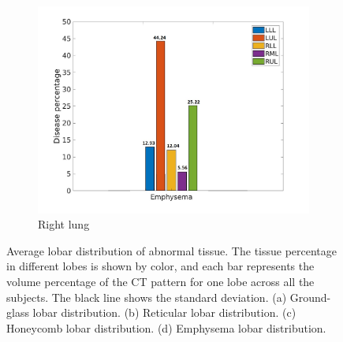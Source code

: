\begin{figure}[H]
\begin{subfigure}{.46\linewidth}
  \includegraphics[width=\linewidth,trim={{.0\wd0} {.0\wd0} {.0\wd0} {.0\wd0}},clip]{QuantitativeAnalysis/Image/EmphysemaLobarRegionDiseaseDistribution.jpg}
  \caption{Right lung}
  \label{fig:LobarRegionDiseaseDistribution-d}
\end{subfigure}
\caption{Average lobar distribution of abnormal tissue. The tissue percentage in different lobes is shown by color, and each bar represents the volume percentage of the CT pattern for one lobe across all the subjects. The black line shows the standard deviation. (a) Ground-glass lobar distribution. (b) Reticular lobar distribution. (c) Honeycomb lobar distribution. (d) Emphysema lobar distribution.}
\label{fig:LobarRegionDiseaseDistribution}
\end{figure}

